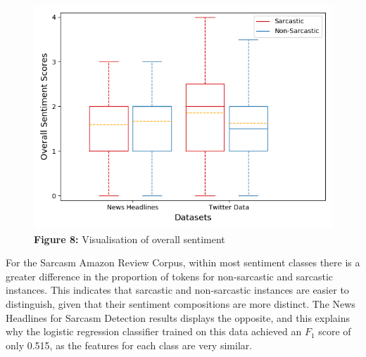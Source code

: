 \documentclass[12pt,a4paper]{article}
\begin{document}
\hspace{-30pt}
\begin{minipage}{0.3\textwidth}
\begin{figure}[H]
	\begin{center}
		\includegraphics[width=1\textwidth]{Images/boxcompare.png}\\
		\textbf{Figure 8:} Visualisation of overall sentiment\\
	\end{center}
\end{figure}
\end{minipage}
\hspace{5pt}
\begin{minipage}{0.70\textwidth}
	
	
	
	For the Sarcasm Amazon Review Corpus, within most sentiment classes there is a greater difference in the proportion of tokens for non-sarcastic and sarcastic instances. This indicates that sarcastic and non-sarcastic instances are easier to distinguish, given that their sentiment compositions are more distinct. The News Headlines for Sarcasm Detection results displays the opposite, and this explains why the logistic regression classifier trained on this data achieved an $F_1$  score of only 0.515, as the features for each class are very similar.
\end{minipage}\vspace{-5pt}
\end{document}
